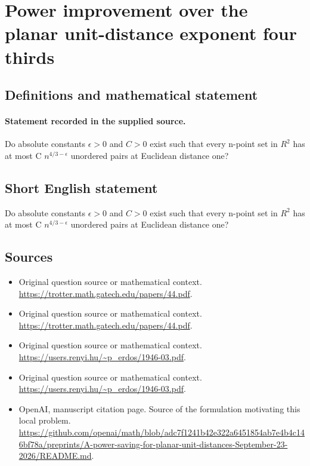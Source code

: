 \documentclass[11pt]{article}
\begin{document}
\section*{Power improvement over the planar unit-distance exponent four thirds}\label{30007107}
\subsection{Definitions and mathematical statement}
\paragraph{Statement recorded in the supplied source.}
Do absolute constants $\epsilon >0$ and $C>0$ exist such that every n-point set in $R^2$ has at most C $n^{4/3-\epsilon }$ unordered pairs at Euclidean distance one?
\subsection{Short English statement}
Do absolute constants $\epsilon >0$ and $C>0$ exist such that every n-point set in $R^2$ has at most C $n^{4/3-\epsilon }$ unordered pairs at Euclidean distance one?
\subsection{Sources}
\begin{itemize}
\item[S1] Original question source or mathematical context.
\url{https://trotter.math.gatech.edu/papers/44.pdf}.
\item[S2] Original question source or mathematical context.
\url{https://trotter.math.gatech.edu/papers/44.pdf}.
\item[S3] Original question source or mathematical context.
\url{https://users.renyi.hu/~p_erdos/1946-03.pdf}.
\item[S4] Original question source or mathematical context.
\url{https://users.renyi.hu/~p_erdos/1946-03.pdf}.
\item[S5] OpenAI, manuscript citation page. Source of the formulation motivating this local problem.
\url{https://github.com/openai/math/blob/adc7f1241b42e322a6451854ab7e4b4c146bf78a/preprints/A-power-saving-for-planar-unit-distances-September-23-2026/README.md}.
\end{itemize}
\end{document}
